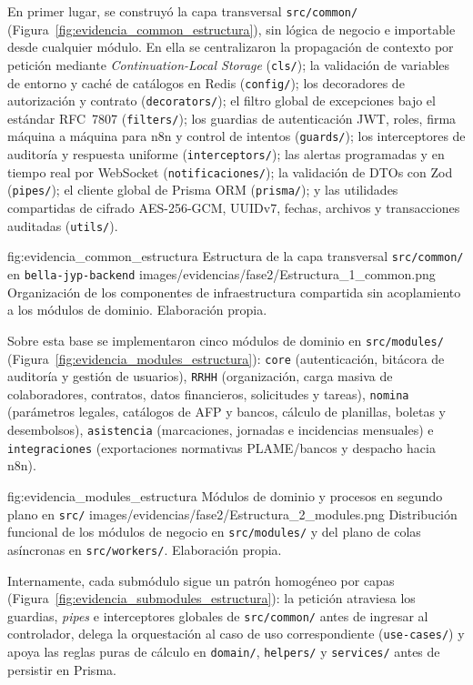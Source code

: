 En primer lugar, se construyó la capa transversal 
\texttt{src/common/} (Figura~\ref{fig:evidencia_common_estructura}), sin lógica de negocio e importable desde cualquier módulo. 
En ella se centralizaron la propagación de contexto por petición mediante \textit{Continuation-Local Storage} (\texttt{cls/}); 
la validación de variables de entorno y caché de catálogos en Redis (\texttt{config/}); 
los decoradores de autorización y contrato (\texttt{decorators/}); 
el filtro global de excepciones bajo el estándar RFC~7807 (\texttt{filters/}); 
los guardias de autenticación JWT, roles, firma máquina a máquina para n8n y control de intentos (\texttt{guards/}); 
los interceptores de auditoría y respuesta uniforme (\texttt{interceptors/}); 
las alertas programadas y en tiempo real por WebSocket (\texttt{notificaciones/}); 
la validación de DTOs con Zod (\texttt{pipes/}); el cliente global de Prisma ORM (\texttt{prisma/}); 
y las utilidades compartidas de cifrado AES-256-GCM, UUIDv7, fechas, archivos y transacciones auditadas (\texttt{utils/}).

\figuraEnTexto
    {fig:evidencia_common_estructura}
    {Estructura de la capa transversal \texttt{src/common/} en \texttt{bella-jyp-backend}}
    {images/evidencias/fase2/Estructura_1_common.png}
    {Organización de los componentes de infraestructura compartida sin acoplamiento a los módulos de dominio. Elaboración propia.}

Sobre esta base se implementaron cinco módulos de dominio en \texttt{src/modules/} (Figura~\ref{fig:evidencia_modules_estructura}): 
\texttt{core} (autenticación, bitácora de auditoría y gestión de usuarios), 
\texttt{RRHH} (organización, carga masiva de colaboradores, contratos, datos financieros, solicitudes y tareas), 
\texttt{nomina} (parámetros legales, catálogos de AFP y bancos, cálculo de planillas, boletas y desembolsos), 
\texttt{asistencia} (marcaciones, jornadas e incidencias mensuales) e 
\texttt{integraciones} (exportaciones normativas PLAME/bancos y despacho hacia n8n).

\figuraEnTexto
    {fig:evidencia_modules_estructura}
    {Módulos de dominio y procesos en segundo plano en \texttt{src/}}
    {images/evidencias/fase2/Estructura_2_modules.png}
    {Distribución funcional de los módulos de negocio en \texttt{src/modules/} y del plano de colas asíncronas en \texttt{src/workers/}. Elaboración propia.}

Internamente, cada submódulo sigue un patrón homogéneo por capas (Figura~\ref{fig:evidencia_submodules_estructura}): 
la petición atraviesa los guardias, \textit{pipes} e interceptores globales de \texttt{src/common/} antes de ingresar al controlador, 
delega la orquestación al caso de uso correspondiente (\texttt{use-cases/}) 
y apoya las reglas puras de cálculo en \texttt{domain/}, \texttt{helpers/} y \texttt{services/} antes de persistir en Prisma.

